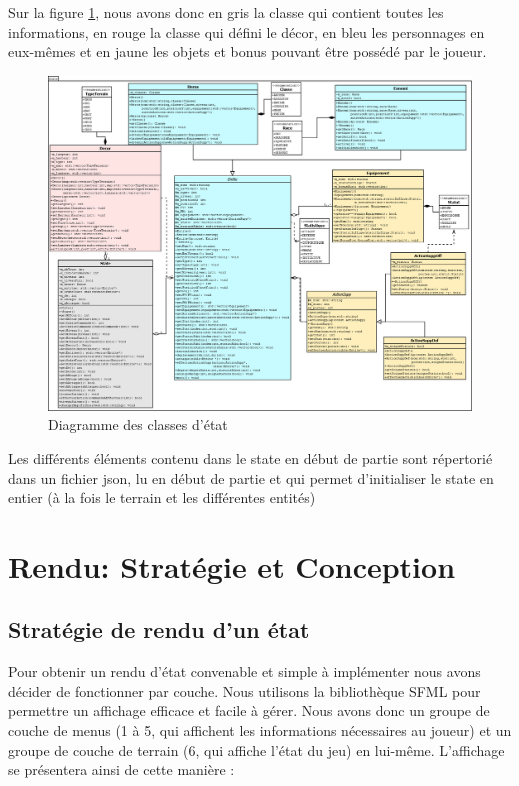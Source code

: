 \documentclass[a4paper,12pt]{article}
\begin{document}
Sur la figure \ref{fig:diaClasseEtat}, nous avons donc en gris la classe qui contient toutes les informations, en rouge la classe qui défini le décor, en bleu les personnages en eux-mêmes et en jaune les objets et bonus pouvant être possédé par le joueur.

\begin{figure}[hbt!]
    \centering
    \includegraphics[width =.75\paperwidth, angle=0]{images/state.png}
    \caption{Diagramme des classes d'état}
    \label{fig:diaClasseEtat}
\end{figure}

Les différents éléments contenu dans le state en début de partie sont répertorié dans un fichier json, lu en début de partie et qui permet d'initialiser le state en entier (à la fois le terrain et les différentes entités)

\clearpage
\section{Rendu: Stratégie et Conception}

\subsection{Stratégie de rendu d'un état}
Pour obtenir un rendu d'état convenable et simple à implémenter nous avons décider de fonctionner par couche. Nous utilisons la bibliothèque SFML pour permettre un affichage efficace et facile à gérer. Nous avons donc un groupe de couche de menus (1 à 5, qui affichent les informations nécessaires au joueur) et un groupe de couche de terrain (6, qui affiche l'état du jeu) en lui-même. L'affichage se présentera ainsi de cette manière :
\end{document}
